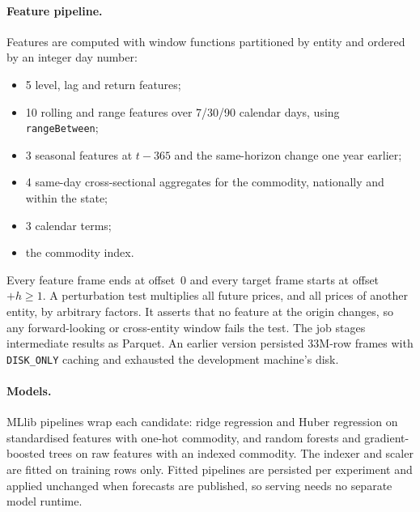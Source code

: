 \documentclass[10pt]{article}
\begin{document}
\paragraph{Feature pipeline.}
Features are computed with window functions partitioned by entity and ordered by an integer day number:
\begin{itemize}
  \item 5 level, lag and return features;
  \item 10 rolling and range features over 7/30/90 calendar days, using \texttt{rangeBetween};
  \item 3 seasonal features at $t-365$ and the same-horizon change one year earlier;
  \item 4 same-day cross-sectional aggregates for the commodity, nationally and within the state;
  \item 3 calendar terms;
  \item the commodity index.
\end{itemize}
Every feature frame ends at offset~0 and every target frame starts at offset $+h\ge 1$.
A perturbation test multiplies all future prices, and all prices of another entity, by arbitrary factors.
It asserts that no feature at the origin changes, so any forward-looking or cross-entity window fails the test.
The job stages intermediate results as Parquet.
An earlier version persisted 33M-row frames with \texttt{DISK\_ONLY} caching and exhausted the development machine's disk.

\paragraph{Models.}
MLlib pipelines wrap each candidate: ridge regression and Huber regression on standardised features with one-hot commodity, and random forests and gradient-boosted trees on raw features with an indexed commodity.
The indexer and scaler are fitted on training rows only.
Fitted pipelines are persisted per experiment and applied unchanged when forecasts are published, so serving needs no separate model runtime.
\end{document}
